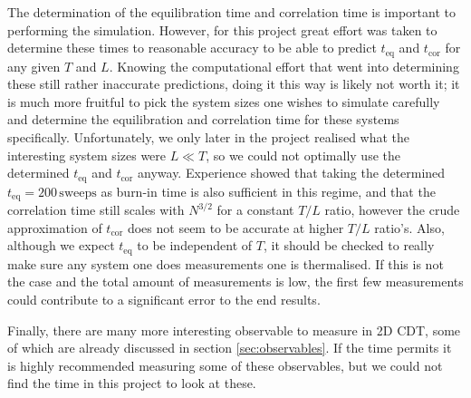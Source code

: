 The determination of the equilibration time and correlation time is important to performing the simulation.
However, for this project great effort was taken to determine these times to reasonable accuracy to be able to predict $t_\text{eq}$ and $t_\text{cor}$ for any given $T$ and $L$.
Knowing the computational effort that went into determining these still rather inaccurate predictions, doing it this way is likely not worth it; it is much more fruitful to pick the system sizes one wishes to simulate carefully and determine the equilibration and correlation time for these systems specifically.
Unfortunately, we only later in the project realised what the interesting system sizes were $L \ll T$, so we could not optimally use the determined $t_\text{eq}$ and $t_\text{cor}$ anyway.
Experience showed that taking the determined $t_\text{eq} = 200 \, \text{sweeps}$ as burn-in time is also sufficient in this regime, and that the correlation time still scales with $N^{3/2}$ for a constant $T/L$ ratio, however the crude approximation of $t_\text{cor}$ does not seem to be accurate at higher $T/L$ ratio's.
Also, although we expect $t_\text{eq}$ to be independent of $T$, it should be checked to really make sure any system one does measurements one is thermalised.
If this is not the case and the total amount of measurements is low, the first few measurements could contribute to a significant error to the end results.

Finally, there are many more interesting observable to measure in 2D CDT, some of which are already discussed in section \ref{sec:observables}.
If the time permits it is highly recommended measuring some of these observables, but we could not find the time in this project to look at these.